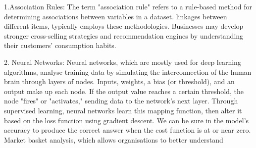 \documentclass[12pt,letterpaper]{article}
\begin{document}
1.Association Rules: The term "association rule" refers to a rule-based method for determining associations between variables in a dataset.  linkages between different items, typically employs these methodologies. Businesses may develop stronger cross-selling strategies and recommendation engines by understanding their customers' consumption habits.

2. Neural Networks: Neural networks, which are mostly used for deep learning algorithms, analyse training data by simulating the interconnection of the human brain through layers of nodes. Inputs, weights, a bias (or threshold), and an output make up each node. If the output value reaches a certain threshold, the node "fires" or "activates," sending data to the network's next layer. Through supervised learning, neural networks learn this mapping function, then alter it based on the loss function using gradient descent. We can be sure in the model's accuracy to produce the correct answer when the cost function is at or near zero.
Market basket analysis, which allows organisations to better understand
\end{document}
